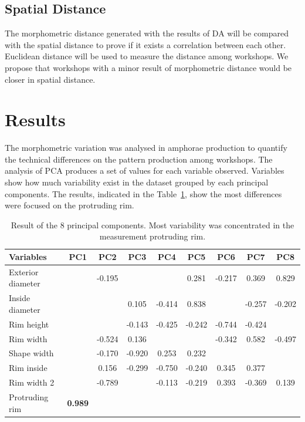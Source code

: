 \documentclass[review]{elsarticle}
\newcommand{\memo}[2]{\textcolor{#1}{#2}}
\newcommand{\xavi}[1]{\memo{orange}{xavi: #1\\}}
\begin{document}

\subsection{Spatial Distance}

The morphometric distance generated with the results of DA will be compared with the spatial distance to prove if it exists a correlation between each other. Euclidean distance will be used to measure the distance among workshops. We propose that workshops with a minor result of morphometric distance would be closer in spatial distance. 

\section{Results}

The morphometric variation was analysed in amphorae production to quantify the technical differences on the pattern production among workshops. 
The analysis of PCA produces a set of values for each variable observed. Variables show how much variability exist in the dataset grouped by each principal components. The results, indicated in the Table~\ref{table:variable}, show the most differences were focused on the protruding rim. 

\begin{table}[htp]
\begin{tabular}{lcccccccc}
\hline
 Variables		&    PC1 & PC2	& PC3 & PC4 & PC5 & PC6 & PC7 & PC8     \\ \hline
 Exterior diameter& 		 &-0.195	&	  &  	&0.281&-0.217&0.369&0.829           \\
 Inside diameter& 		 &		&0.105&-0.414&0.838&	    &-0.257&-0.202           \\
 Rim height&              &      &-0.143&-0.425&-0.242&-0.744&-0.424&           \\
 Rim width&       		 &-0.524	&0.136&  	&	  &-0.342&0.582&-0.497        \\
 Shape width&     		 &-0.170	&-0.920&0.253&0.232&		&     &          \\
 Rim inside&     		 &0.156 &-0.299&-0.750&-0.240&0.345&0.377&          \\                                    
 Rim width 2& 	         &-0.789	&	  &-0.113&-0.219	&0.393&-0.369&0.139          \\	
Protruding rim& \textbf{0.989} &      &      &     &     &     &     &          \\
\hline
\end{tabular}
\caption{Result of the 8 principal components. Most variability was concentrated in the measurement protruding rim.}
\label{table:variable}
\end{table}
\end{document}
